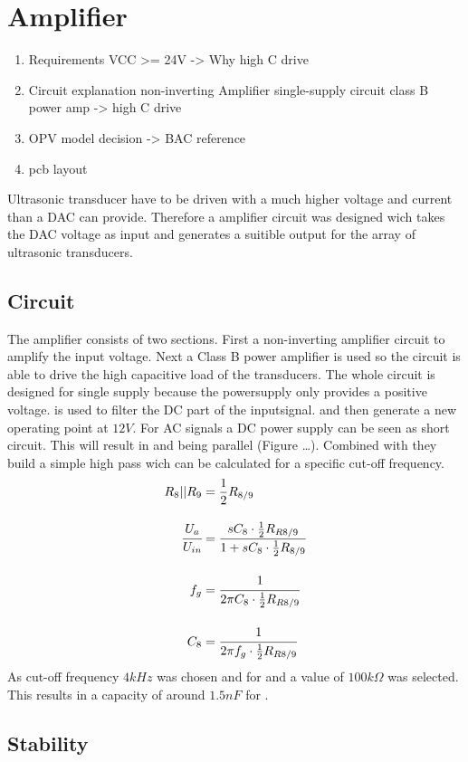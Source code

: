 \section{Amplifier}\label{sec:pcb:amp}

\begin{enumerate}
  \item Requirements
  \subitem VCC >= 24V -> Why
  \subitem high C drive
  \item Circuit explanation
  \subitem non-inverting Amplifier
  \subitem single-supply circuit
  \subitem class B power amp -> high C drive
  \item OPV model decision -> BAC reference
  \item pcb layout
\end{enumerate}

Ultrasonic transducer have to be driven with a much higher voltage and current than a DAC can provide. Therefore a amplifier circuit was designed wich takes the DAC voltage as input and generates a suitible output for the array of ultrasonic transducers.

\subsection{Circuit}

The amplifier consists of two sections. First a non-inverting amplifier circuit to amplify the input voltage. Next a Class B power amplifier is used so the circuit is able to drive the high capacitive load of the transducers. The whole circuit is designed for single supply because the powersupply only provides a positive voltage.\p
%
 is used to filter the DC part of the inputsignal.  and  then generate a new operating point at $12V$. For AC signals a DC power supply can be seen as short circuit. This will result in  and  being parallel (Figure \dots). Combined with  they build a simple high pass wich can be calculated for a specific cut-off frequency.
%
\begin{align}
  R_8 || R_9 &= \frac{1}{2} R_{8/9} \pmath
  \cfrac{U_a}{U_{in}} &= \cfrac{sC_8\cdot \frac{1}{2}R_{R8/9}}{1 + sC_8\cdot \frac{1}{2}R_{8/9}} \pmath
  f_g &= \cfrac{1}{2 \pi C_8 \cdot \frac{1}{2}R_{R8/9}} \pmath
  C_8 &= \cfrac{1}{2 \pi f_g \cdot \frac{1}{2}R_{R8/9}}
\end{align}
%
As cut-off frequency $4kHz$ was chosen and for  and  a value of $100k\Omega$ was selected. This results in a capacity of around $1.5nF$ for .\p
%


\subsection{Stability}